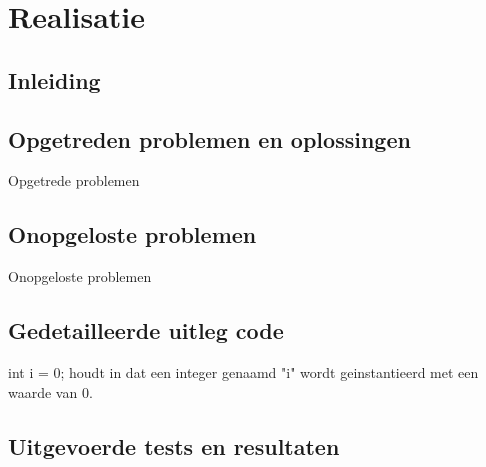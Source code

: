 \chapter{Realisatie}
\section{Inleiding}
\newpage

\section{Opgetreden problemen en oplossingen}
Opgetrede problemen

\section{Onopgeloste problemen}
Onopgeloste problemen

\section{Gedetailleerde uitleg code}
int i = 0; houdt in dat een integer genaamd "i" wordt geinstantieerd met een waarde van 0.

\section{Uitgevoerde tests en resultaten}
